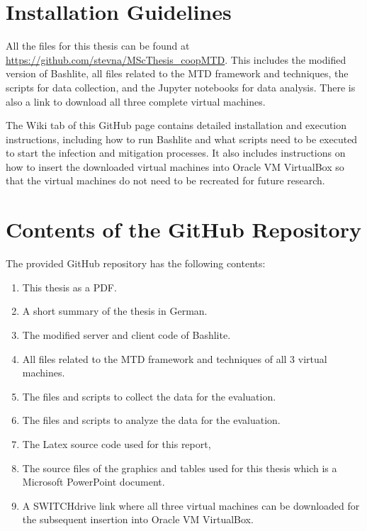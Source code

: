 \appendix

\chapter{Installation Guidelines}
All the files for this thesis can be found at \url{https://github.com/stevna/MScThesis_coopMTD}. This includes the modified version of Bashlite, all files related to the MTD framework and techniques, the scripts for data collection, and the Jupyter notebooks for data analysis. There is also a link to download all three complete virtual machines.

The Wiki tab of this GitHub page contains detailed installation and execution instructions, including how to run Bashlite and what scripts need to be executed to start the infection and mitigation processes. It also includes instructions on how to insert the downloaded virtual machines into Oracle VM VirtualBox so that the virtual machines do not need to be recreated for future research. 

\chapter{Contents of the GitHub Repository}
The provided GitHub repository has the following contents:
\begin{enumerate}
    \item This thesis as a PDF.
    \item A short summary of the thesis in German. 
    \item The modified server and client code of Bashlite.
    \item All files related to the MTD framework and techniques of all 3 virtual machines.
    \item The files and scripts to collect the data for the evaluation.
    \item The files and scripts to analyze the data for the evaluation.
    \item The Latex source code used for this report,
    \item The source files of the graphics and tables used for this thesis which is a Microsoft PowerPoint document.
    \item A SWITCHdrive link where all three virtual machines can be downloaded for the subsequent insertion into Oracle VM VirtualBox. 
    
\end{enumerate}

